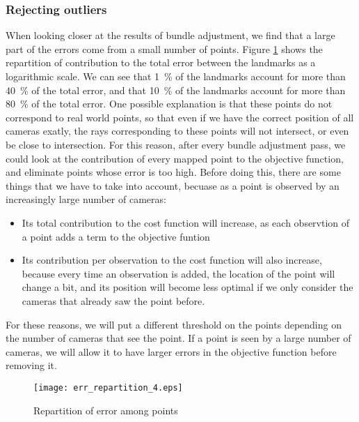 \subsubsection{Rejecting outliers}
When looking closer at the results of bundle adjustment, we find that a large part of the errors come from a small number of points. Figure \ref{fig:errorrepartition} shows the repartition of contribution to the total error between the landmarks as a logarithmic scale. We can see that \SI{1}{\percent} of the landmarks account for more than \SI{40}{\percent} of the total error, and that \SI{10}{\percent} of the landmarks account for more than \SI{80}{\percent} of the total error.  One possible explanation is that these points do not correspond to real world points, so that even if we have the correct position of all cameras exatly, the rays corresponding to these points will not intersect, or even be close to intersection. For this reason, after every bundle adjustment pass, we could look at the contribution of every mapped point to the objective function, and eliminate points whose error is too high. Before doing this, there are some things that we have to take into account, becuase as a point is observed by an increasingly large number of cameras:
\begin{itemize}
  \item Its total contribution to the cost function will increase, as each observtion of a point adds a term to the objective funtion
  \item Its contribution per observation to the cost function will also increase, because every time an observation is added, the location of the point will change a bit, and its position will become less optimal if we only consider the cameras that already saw the point before.
\end{itemize}
For these reasons, we will put a different threshold on the points depending on the number of cameras that see the point. If a point is seen by a large number of cameras, we will allow it to have larger errors in the objective function before removing it.


\begin{figure}[H]
  \centering
  \texttt{[image: err\_repartition\_4.eps]}
  \caption{Repartition of error among points}
  \label{fig:errorrepartition}
\end{figure}





